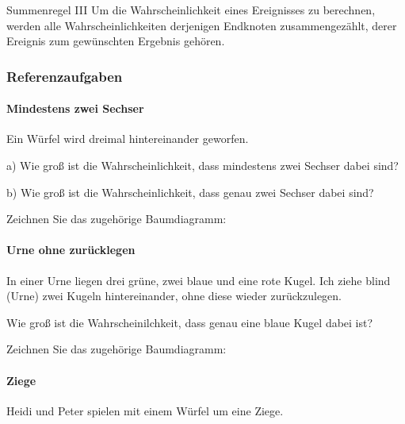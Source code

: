 \begin{gesetz}{Summenregel III}{}
  Um die Wahrscheinlichkeit eines Ereignisses zu berechnen, werden alle Wahrscheinlichkeiten derjenigen Endknoten zusammengezählt, derer Ereignis zum gewünschten Ergebnis gehören.
  \end{gesetz}

\newpage


\subsubsection{Referenzaufgaben}

\paragraph{Mindestens zwei Sechser} Ein Würfel wird dreimal hintereinander geworfen.

a) Wie groß ist die Wahrscheinlichkeit, dass mindestens zwei Sechser dabei sind?

b) Wie groß ist die Wahrscheinlichkeit, dass genau zwei Sechser dabei sind?

Zeichnen Sie das zugehörige Baumdiagramm:

\newpage


\paragraph{Urne ohne zurücklegen} In einer Urne liegen drei grüne, zwei blaue und eine rote Kugel. Ich ziehe blind (Urne) zwei Kugeln hintereinander, ohne diese wieder zurückzulegen.

Wie groß ist die Wahrscheinilchkeit, dass genau eine blaue Kugel dabei ist?

Zeichnen Sie das zugehörige Baumdiagramm:

  
\newpage

\paragraph{Ziege} Heidi und Peter spielen mit einem Würfel um eine Ziege.

